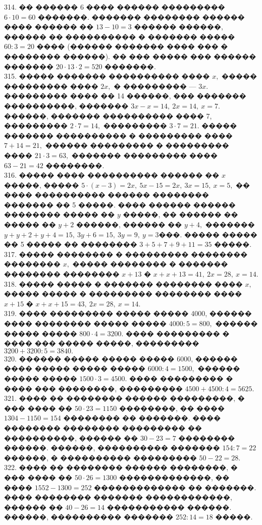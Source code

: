 \documentclass[12pt]{article}
\begin{document}
314. �� ������ 6 ���� ������ ��������� $6\cdot10=60$ �������. ������� �������� ������ ���� ������ �� $13-10=3$ ������ ������, ������ �� ���������� � ������� ����� $60:3=20$ ���� (������ ������� ���� ��� � �������� ������). �� ��� ����� ��� ������ ������� $20\cdot13\cdot2=520$ �������.\\
315. ����� ������� ���������� ���� $x,$ ����� ��������� ���� $2x,$ � ��������� --- $3x.$ ��������� ���� �� 14 ������, ��� ������� ����������, ������� $3x-x=14,\ 2x=14,\ x=7.$ ������, ������� ���������� ���� 7, ��������� $2\cdot7=14,$ ��������� $3\cdot7=21.$ ����� ������� ���������� � ��������� ���� $7+14=21,$ ������ ��������� � ��������� ���� $21\cdot3=63,$ ������� ��������� ���� $63-21=42$ ��������.\\
316. ����� ���� ���������� ������ �� $x$ �����, ����� $5\cdot(x-3)=2x,\ 5x-15=2x,\ 3x=15,\ x=5,$ �� ���� ���������� ������ �������� ������� �� 5 �����. ���� ������ ������ �������� ����� �� $y$ �����, �� ������ �� ����� �� $y+2$ ������, ������ �� $y+4,$ ������� $y+y+2+y+4=15,\ 3y+6=15,\ 3y=9,\ y=3$���. ����� ����� �� 5 ����� �� �������� $3+5+7+9+11=35$ �����.\\
317. ����� �������� � ��������� �������� �������� $x,$ ����� �������� � ������� �������� �������� $x+13$ � $x+x+13=41,\ 2x=28,\ x=14.$\\
318. ����� ����� � ������� �������� ���� $x,$ ����� ����� � ��������� �������� ���� $x+15$ � $x+x+15=43,\ 2x=28,\ x=14.$\\
319. ���� ��������� ����� ����� 4000, ������ ���� �������� ����� ����� $4000:5=800,$ ������ ����� ����� $800\cdot4=3200.$ ���� ��������� � ���� ��� ����� �����, ��������� $3200+3200:5=3840.$\\
320. ������ ����� ����� ����� 6000, ������ ���� ����� ����� ����� $6000:4=1500,$ ������ ����� ����� $1500\cdot3=4500.$ ���� ��������� � ���� ��� ��������, ��������� $4500+4500:4=5625.$\\
321. ���� �� �������� ������ ���������, � ��� ���� �� $50\cdot23=1150$ ��������, �� ���� $1304-1150=154$ �������� �� �������. ���� �������� �������� ��������� �� ����������, ������ �� $30-23=7$ �������� ������. ������, ���������� ������� $154:7=22$ ������, � ���������� ��������� $50-22=28.$\\
322. ���� �� �������� ������ ��������, � ��� ���� �� $50\cdot26=1300$ �������������, �� ���� $1552-1300=252$ ������������� �� �������. ���� �������� ������� ������������, ������ �� $40-26=14$ ����������� ������. ������, ���������� ������� $252:14=18$ �����.\\
\end{document}
